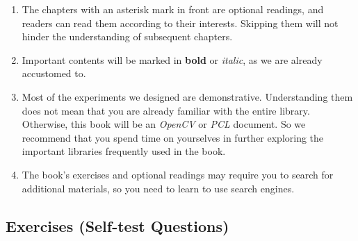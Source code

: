 \begin{English}
\begin{enumerate}
    	\item The chapters with an asterisk mark in front are optional readings, and readers can read them according to their interests. Skipping them will not hinder the understanding of subsequent chapters.
    
    	\item Important contents will be marked in \textbf{bold} or \emph{italic}, as we are already accustomed to.
    
    	\item Most of the experiments we designed are demonstrative. Understanding them does not mean that you are already familiar with the entire library. Otherwise, this book will be an \textit{OpenCV} or \textit{PCL} document. So we recommend that you spend time on yourselves in further exploring the important libraries frequently used in the book.
    
    	\item The book's exercises and optional readings may require you to search for additional materials, so you need to learn to use search engines.
    \end{enumerate}
\end{English}

\begin{Russian}
    
\end{Russian}

\begin{English}
    \section*{Exercises (Self-test Questions)}
\end{English}

\begin{Russian}
    
\end{Russian}

